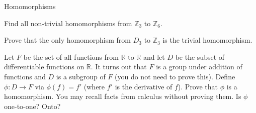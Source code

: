 \begin{section}{Homomorphisms}
\begin{exercise}
Find all non-trivial homomorphisms from $\mathbb{Z}_3$ to $\mathbb{Z}_6$.
\end{exercise}

\begin{problem}
Prove that the only homomorphism from $D_3$ to $\mathbb{Z}_3$ is the trivial homomorphism.
\end{problem}

\begin{exercise}
Let $F$ be the set of all functions from $\mathbb{R}$ to $\mathbb{R}$ and let $D$ be the subset of differentiable functions on $\mathbb{R}$.  It turns out that $F$ is a group under addition of functions and $D$ is a subgroup of $F$ (you do not need to prove this). Define $\phi:D\to F$ via $\phi(f)=f'$ (where $f'$ is the derivative of $f$). Prove that $\phi$ is a homomorphism.  You may recall facts from calculus without proving them. Is $\phi$ one-to-one? Onto? 
\end{exercise}

\end{section}

